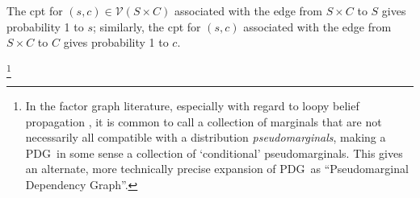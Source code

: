\documentclass{article}
\newcommand{\vfullfootnote}[1]{}
\renewcommand{\vfullfootnote}[1]{\footnote{#1}}
\newcommand{\V}{\mathcal V}
\newcommand{\MN}{PDG}
\numberwithin{equation}{section}
\begin{document}
The cpt for $(s,c) \in \V(S \times C)$  associated with 
the edge from $S \times C$ to $S$ gives probability 1 to $s$;
similarly, the cpt for $(s,c)$  associated with 
the edge from $S \times C$ to $C$ gives probability 1 to $c$.

	
	\vfullfootnote{In the factor graph literature, especially with regard to loopy belief propagation \parencite{wainwright2008graphical}, it is common to call a collection of marginals that are not necessarily all compatible with a distribution \emph{pseudomarginals}, making a \MN\ in some sense a collection of `conditional' pseudomarginals. This gives an alternate, more technically precise expansion of \MN\ as ``Pseudomarginal Dependency Graph''.}
\end{document}
